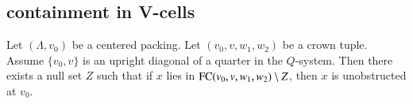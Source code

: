 \subsection{containment in V-cells}

%
%
%
%
%

\begin{lemma}
Let $(\Lambda,v_0)$ be a centered packing.  Let $(v_0,v,w_1,w_2)$
be a crown tuple.
Assume $\{v_0,v\}$ is an upright diagonal of a quarter in the
$Q$-system.   
Then there exists a null set $Z$ such that if $x$ lies in %
${\operatorname{FC}}(v_0,v,w_1,w_2)\setminus Z$,
then $x$ is unobstructed at $v_0$.
\end{lemma}

